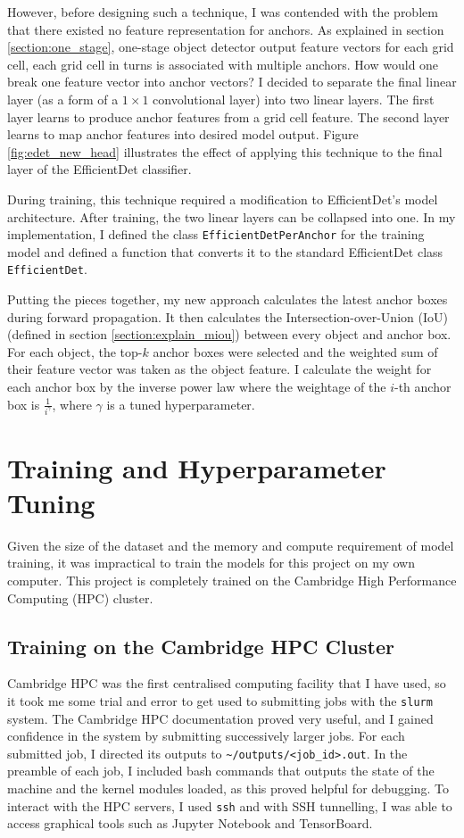 \documentclass[12pt,a4paper,twoside,openany]{report}
\begin{document}
However, before designing such a technique, I was contended with the problem that there existed no feature representation for anchors. As explained in section \ref{section:one_stage}, one-stage object detector output feature vectors for each grid cell, each grid cell in turns is associated with multiple anchors. How would one break one feature vector into anchor vectors? I decided to separate the final linear layer (as a form of a $1\times1$ convolutional layer) into two linear layers. The first layer learns to produce anchor features from a grid cell feature. The second layer learns to map anchor features into desired model output. Figure \ref{fig:edet_new_head} illustrates the effect of applying this technique to the final layer of the EfficientDet classifier.

During training, this technique required a modification to EfficientDet's model architecture. After training, the two linear layers can be collapsed into one. In my implementation, I defined the class \verb|EfficientDetPerAnchor| for the training model and defined a function that converts it to the standard EfficientDet class \verb|EfficientDet|. 

Putting the pieces together, my new approach calculates the latest anchor boxes during forward propagation. It then calculates the Intersection-over-Union (IoU) (defined in section \ref{section:explain_miou}) between every object and anchor box. For each object, the top-$k$ anchor boxes were selected and the weighted sum of their feature vector was taken as the object feature. I calculate the weight for each anchor box by the inverse power law where the weightage of the $i$-th anchor box is $\frac{1}{i^{\gamma}}$, where $\gamma$ is a tuned hyperparameter.


\section{Training and Hyperparameter Tuning}
Given the size of the dataset and the memory and compute requirement of model training, it was impractical to train the models for this project on my own computer. This project is completely trained on the Cambridge High Performance Computing (HPC) cluster.

\subsection{Training on the Cambridge HPC Cluster}
Cambridge HPC was the first centralised computing facility that I have used, so it took me some trial and error to get used to submitting jobs with the \verb|slurm| system. The Cambridge HPC documentation proved very useful, and I gained confidence in the system by submitting successively larger jobs. For each submitted job, I directed its outputs to \verb|~/outputs/<job_id>.out|. In the preamble of each job, I included bash commands that outputs the state of the machine and the kernel modules loaded, as this proved helpful for debugging. To interact with the HPC servers, I used \verb|ssh| and with SSH tunnelling, I was able to access graphical tools such as Jupyter Notebook and TensorBoard.
\end{document}
